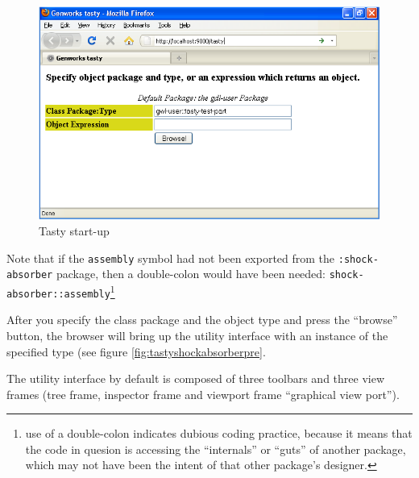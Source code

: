 \documentclass [11pt]{book}
\begin{document}
\begin{figure}
\begin{center}
\includegraphics{../images/tasty-start.png}
\end{center}

\caption{Tasty start-up}

\label{fig:tasty-startup}

\end{figure}


Note that if the \texttt{assembly} symbol had not been exported from the \texttt{:shock-absorber} package, then a double-colon would have been needed: \texttt{shock-absorber::assembly}\footnote{use of a double-colon indicates dubious coding
practice, because it means that the code in quesion is accessing the
``internals'' or ``guts'' of another package, which may not have been
the intent of that other package's designer.}



After you specify the class package and the object type and press the
``browse'' button, the browser will bring up the utility interface
with an instance of the specified type (see figure 
\ref{fig:tastyshockabsorberpre}.



The utility interface by default is composed of three toolbars and
three view frames (tree frame, inspector frame and viewport frame
``graphical view port'').
\end{document}
